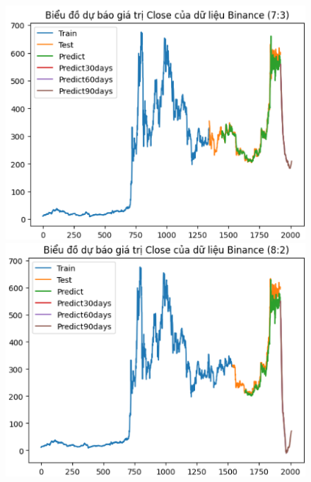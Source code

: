 \documentclass[conference]{IEEEtran}
\begin{document}
	\begin{figure}[H]
		\centering
		\begin{minipage}{0.15\textwidth}
			\centering
			\includegraphics[width=1\textwidth]{Figure/BNB73.png}
		\end{minipage}
		\hfill
		\begin{minipage}{0.15\textwidth}
			\centering
			\includegraphics[width=1\textwidth]{Figure/BNB82.png}
		\end{minipage}
		\hfill
		\begin{minipage}{0.15\textwidth}
			\centering

\end{minipage}
\end{figure}
\end{document}
